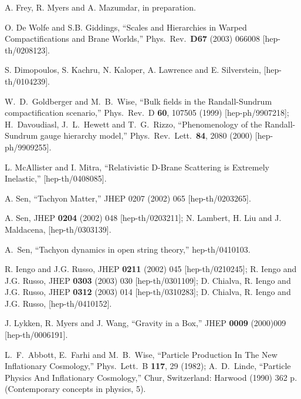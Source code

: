 \documentclass[12pt]{JHEP3}
\begin{document}
\begin{thebibliography}{4}
A. Frey, R. Myers and A. Mazumdar, in preparation.

O. De Wolfe and S.B. Giddings, ``Scales and Hierarchies in Warped
Compactifications and Brane Worlds,'' Phys.\ Rev.\ {\bf D67}
(2003) 066008 [hep-th/0208123].

S. Dimopoulos, S. Kachru, N. Kaloper, A. Lawrence and E.
Silverstein,
[hep-th/0104239].

W.~D.~Goldberger and M.~B.~Wise, ``Bulk fields in the
Randall-Sundrum compactification scenario,'' Phys.\ Rev.\ D {\bf
60}, 107505 (1999) [hep-ph/9907218];
%
H.~Davoudiasl, J.~L.~Hewett and T.~G.~Rizzo, ``Phenomenology of
the Randall-Sundrum gauge hierarchy model,'' Phys.\ Rev.\ Lett.\
{\bf 84}, 2080 (2000) [hep-ph/9909255].

L. McAllister and I. Mitra, ``Relativistic D-Brane Scattering is
Extremely Inelastic,'' [hep-th/0408085].

A. Sen, ``Tachyon Matter,'' JHEP 0207 (2002) 065 [hep-th/0203265].

A. Sen,
JHEP {\bf 0204} (2002) 048 [hep-th/0203211];
%
N. Lambert, H. Liu and J. Maldacena,
[hep-th/0303139].

A.~Sen, ``Tachyon dynamics in open string theory,''
hep-th/0410103.

R. Iengo and J.G. Russo,
JHEP {\bf 0211} (2002) 045 [hep-th/0210245];
%
R. Iengo and J.G. Russo,
JHEP {\bf 0303} (2003) 030 [hep-th/0301109];
%
D. Chialva, R. Iengo and J.G. Russo,
JHEP {\bf 0312} (2003) 014 [hep-th/0310283];
%
D. Chialva, R. Iengo and J.G. Russo,
[hep-th/0410152].

J. Lykken, R. Myers and J. Wang, ``Gravity in a Box,'' JHEP {\bf
0009} (2000)009 [hep-th/0006191].

L.~F.~Abbott, E.~Farhi and M.~B.~Wise,
``Particle Production In The New Inflationary Cosmology,''
Phys.\ Lett.\ B {\bf 117}, 29 (1982);
A.~D.~Linde,
``Particle Physics And Inflationary Cosmology,''
 Chur, Switzerland: Harwood (1990) 362 p. (Contemporary concepts in physics, 5).


\end{thebibliography}
\end{document}
